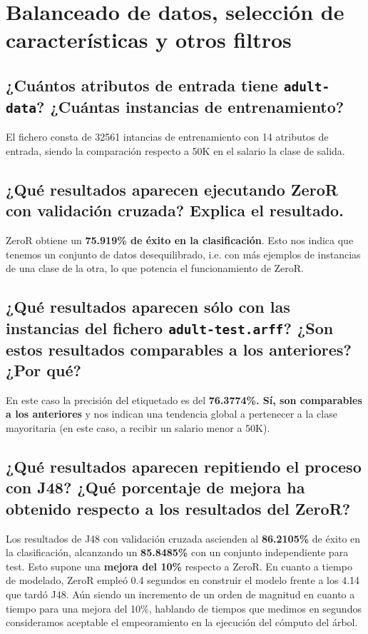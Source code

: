 \documentclass[12pt]{article}
\begin{document}
\newpage

\section{Balanceado de datos, selección de características y otros filtros}

\subsection*{\small ¿Cuántos atributos de entrada tiene \texttt{adult-data}?
¿Cuántas instancias de entrenamiento?}

El fichero consta de 32561 intancias de entrenamiento con 14 atributos de
entrada, siendo la comparación respecto a 50K en el salario la clase de salida.

\subsection*{\small ¿Qué resultados aparecen ejecutando ZeroR con validación
cruzada? Explica el resultado.}

ZeroR obtiene un \textbf{75.919\% de éxito en la clasificación}. Esto nos
indica que tenemos un conjunto de datos desequilibrado, i.e. con más ejemplos de
instancias de una clase de la otra, lo que potencia el funcionamiento de ZeroR.

\subsection*{\small ¿Qué resultados aparecen sólo con las instancias del fichero
\texttt{adult-test.arff}? ¿Son estos resultados comparables a los anteriores?
¿Por qué?}

En este caso la precisión del etiquetado es del \textbf{76.3774\%. Sí, son
comparables a los anteriores} y nos indican una tendencia global a pertenecer a
la clase mayoritaria (en este caso, a recibir un salario menor a 50K).

\subsection*{\small ¿Qué resultados aparecen repitiendo el proceso con J48?
¿Qué porcentaje de mejora ha obtenido respecto a los resultados del ZeroR?}

Los resultados de J48 con validación cruzada ascienden al \textbf{86.2105\%}
de éxito en la clasificación, alcanzando un \textbf{85.8485\%} con un conjunto
independiente para test. Esto supone una \textbf{mejora del 10\%} respecto a
ZeroR. En cuanto a tiempo de modelado, ZeroR empleó 0.4 segundos en construir
el modelo frente a los 4.14 que tardó J48. Aún siendo un incremento de un orden
de magnitud en cuanto a tiempo para una mejora del 10\%, hablando de tiempos
que medimos en segundos consideramos aceptable el empeoramiento en la ejecución
del cómputo del árbol.
\end{document}
